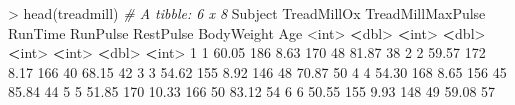 \documentclass[
]{book}
\newenvironment{Shaded}{\begin{snugshade}}{\end{snugshade}}
\newcommand{\CommentTok}[1]{\textcolor[rgb]{0.56,0.35,0.01}{\textit{#1}}}
\newcommand{\DecValTok}[1]{\textcolor[rgb]{0.00,0.00,0.81}{#1}}
\newcommand{\ErrorTok}[1]{\textcolor[rgb]{0.64,0.00,0.00}{\textbf{#1}}}
\newcommand{\FloatTok}[1]{\textcolor[rgb]{0.00,0.00,0.81}{#1}}
\newcommand{\FunctionTok}[1]{\textcolor[rgb]{0.00,0.00,0.00}{#1}}
\newcommand{\NormalTok}[1]{#1}
\newcommand{\SpecialCharTok}[1]{\textcolor[rgb]{0.00,0.00,0.00}{#1}}
\begin{document}
\begin{Shaded}
\begin{Highlighting}[]
\SpecialCharTok{\textgreater{}} \FunctionTok{head}\NormalTok{(treadmill)}
\CommentTok{\# A tibble: 6 x 8}
\NormalTok{  Subject TreadMillOx TreadMillMaxPulse RunTime RunPulse RestPulse BodyWeight   Age}
    \SpecialCharTok{\textless{}}\NormalTok{int}\SpecialCharTok{\textgreater{}}       \ErrorTok{\textless{}}\NormalTok{dbl}\SpecialCharTok{\textgreater{}}             \ErrorTok{\textless{}}\NormalTok{int}\SpecialCharTok{\textgreater{}}   \ErrorTok{\textless{}}\NormalTok{dbl}\SpecialCharTok{\textgreater{}}    \ErrorTok{\textless{}}\NormalTok{int}\SpecialCharTok{\textgreater{}}     \ErrorTok{\textless{}}\NormalTok{int}\SpecialCharTok{\textgreater{}}      \ErrorTok{\textless{}}\NormalTok{dbl}\SpecialCharTok{\textgreater{}} \ErrorTok{\textless{}}\NormalTok{int}\SpecialCharTok{\textgreater{}}
\DecValTok{1}       \DecValTok{1}       \FloatTok{60.05}               \DecValTok{186}    \FloatTok{8.63}      \DecValTok{170}        \DecValTok{48}      \FloatTok{81.87}    \DecValTok{38}
\DecValTok{2}       \DecValTok{2}       \FloatTok{59.57}               \DecValTok{172}    \FloatTok{8.17}      \DecValTok{166}        \DecValTok{40}      \FloatTok{68.15}    \DecValTok{42}
\DecValTok{3}       \DecValTok{3}       \FloatTok{54.62}               \DecValTok{155}    \FloatTok{8.92}      \DecValTok{146}        \DecValTok{48}      \FloatTok{70.87}    \DecValTok{50}
\DecValTok{4}       \DecValTok{4}       \FloatTok{54.30}               \DecValTok{168}    \FloatTok{8.65}      \DecValTok{156}        \DecValTok{45}      \FloatTok{85.84}    \DecValTok{44}
\DecValTok{5}       \DecValTok{5}       \FloatTok{51.85}               \DecValTok{170}   \FloatTok{10.33}      \DecValTok{166}        \DecValTok{50}      \FloatTok{83.12}    \DecValTok{54}
\DecValTok{6}       \DecValTok{6}       \FloatTok{50.55}               \DecValTok{155}    \FloatTok{9.93}      \DecValTok{148}        \DecValTok{49}      \FloatTok{59.08}    \DecValTok{57}


\end{Highlighting}
\end{Shaded}
\end{document}
